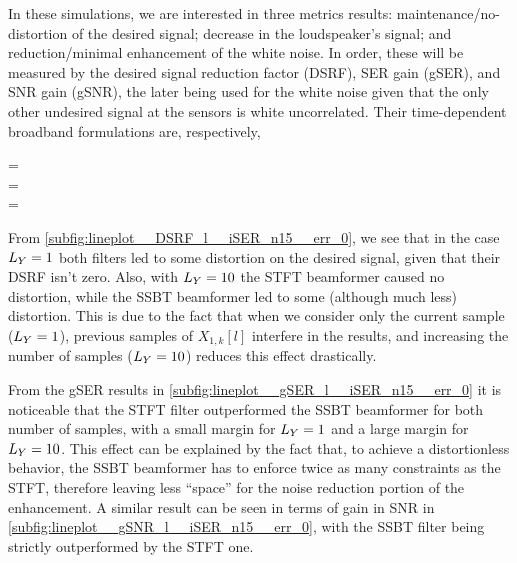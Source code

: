 In these simulations, we are interested in three metrics results: maintenance/no-distortion of the desired signal; decrease in the loudspeaker's signal; and reduction/minimal enhancement of the white noise. In order, these will be measured by the desired signal reduction factor (DSRF), SER gain (gSER), and SNR gain (gSNR), the later being used for the white noise given that the only other undesired signal at the sensors is white uncorrelated. Their time-dependent broadband formulations are, respectively,
\begin{subgather}
	\dsrf[l] =  \\
	\gser[l] =  \cdot {} \\
	\gsnr[l] =  \cdot {}
\end{subgather}

From \cref{subfig:lineplot__DSRF_l__iSER_n15__err_0}, we see that in the case $\Ly = 1$ both filters led to some distortion on the desired signal, given that their DSRF isn't zero. Also, with $\Ly = 10$ the STFT beamformer caused no distortion, while the SSBT beamformer led to some (although much less) distortion. This is due to the fact that when we consider only the current sample ($\Ly = 1$), previous samples of $X_{1,k}[l]$ interfere in the results, and increasing the number of samples ($\Ly = 10$) reduces this effect drastically.

From the gSER results in \cref{subfig:lineplot__gSER_l__iSER_n15__err_0} it is noticeable that the STFT filter outperformed the SSBT beamformer for both number of samples, with a small margin for $\Ly = 1$ and a large margin for $\Ly = 10$. This effect can be explained by the fact that, to achieve a distortionless behavior, the SSBT beamformer has to enforce twice as many constraints as the STFT, therefore leaving less ``space'' for the noise reduction portion of the enhancement. A similar result can be seen in terms of gain in SNR in \cref{subfig:lineplot__gSNR_l__iSER_n15__err_0}, with the SSBT filter being strictly outperformed by the STFT one.



